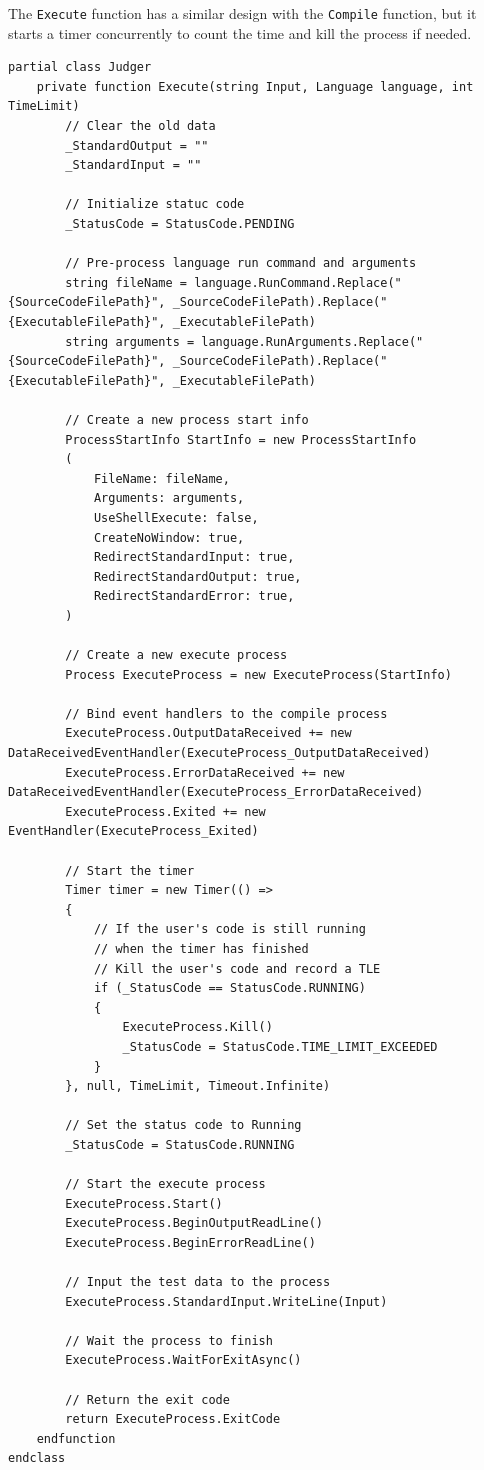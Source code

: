 \documentclass[a4paper]{report}
\begin{document}
The \texttt{Execute} function has a similar design with the \texttt{Compile} function, but it starts a timer concurrently to count the time and kill the process if needed.

\begin{verbatim}
partial class Judger
    private function Execute(string Input, Language language, int TimeLimit)
        // Clear the old data
        _StandardOutput = ""
        _StandardInput = ""

        // Initialize statuc code
        _StatusCode = StatusCode.PENDING

        // Pre-process language run command and arguments
        string fileName = language.RunCommand.Replace("{SourceCodeFilePath}", _SourceCodeFilePath).Replace("{ExecutableFilePath}", _ExecutableFilePath)
        string arguments = language.RunArguments.Replace("{SourceCodeFilePath}", _SourceCodeFilePath).Replace("{ExecutableFilePath}", _ExecutableFilePath)

        // Create a new process start info
        ProcessStartInfo StartInfo = new ProcessStartInfo
        (
            FileName: fileName,
            Arguments: arguments,
            UseShellExecute: false,
            CreateNoWindow: true,
            RedirectStandardInput: true,
            RedirectStandardOutput: true,
            RedirectStandardError: true,
        )

        // Create a new execute process
        Process ExecuteProcess = new ExecuteProcess(StartInfo)

        // Bind event handlers to the compile process
        ExecuteProcess.OutputDataReceived += new DataReceivedEventHandler(ExecuteProcess_OutputDataReceived)
        ExecuteProcess.ErrorDataReceived += new DataReceivedEventHandler(ExecuteProcess_ErrorDataReceived)
        ExecuteProcess.Exited += new EventHandler(ExecuteProcess_Exited)

        // Start the timer
        Timer timer = new Timer(() => 
        {
            // If the user's code is still running 
            // when the timer has finished
            // Kill the user's code and record a TLE
            if (_StatusCode == StatusCode.RUNNING)
            {
                ExecuteProcess.Kill()
                _StatusCode = StatusCode.TIME_LIMIT_EXCEEDED
            }
        }, null, TimeLimit, Timeout.Infinite)

        // Set the status code to Running
        _StatusCode = StatusCode.RUNNING

        // Start the execute process
        ExecuteProcess.Start()
        ExecuteProcess.BeginOutputReadLine()
        ExecuteProcess.BeginErrorReadLine()

        // Input the test data to the process
        ExecuteProcess.StandardInput.WriteLine(Input)

        // Wait the process to finish
        ExecuteProcess.WaitForExitAsync()

        // Return the exit code
        return ExecuteProcess.ExitCode
    endfunction
endclass
\end{verbatim}
\end{document}
